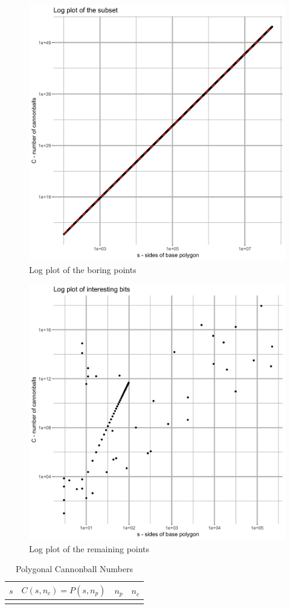 \begin{figure}[H]
\centering
\includegraphics[width=\textwidth]{../graph/boring_log.png}
\caption{Log plot of the boring points}
\label{fig_log_boring}
\end{figure}

\begin{figure}[H]
\centering
\includegraphics[width=\textwidth]{../graph/interesting_log.png}
\caption{Log plot of the remaining points}
\label{fig_log_interesting}
\end{figure}

\begin{longtable}{*4r}
\toprule
\boldmath \(s\) & \boldmath \(C(s, n_c) = P(s, n_p)\)
& \boldmath \(n_p\) & \boldmath \(n_c\) \\
\midrule
\endhead

\bottomrule
\caption{Polygonal Cannonball Numbers}
\label{tab_ugly}
\end{longtable}
